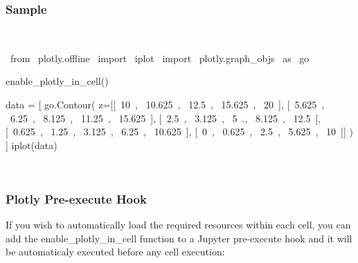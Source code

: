 \subsubsection{Sample}

\begin{paracol}{2}
\smallskip
\begin{cellExecute}[escapechar=~]
~~
\end{cellExecute}
\switchcolumn
\begin{codeCell}[escapechar=~]
~\textcolor{mtk17}{from}~ plotly.offline ~\textcolor{mtk17}{import}~ iplot
~\textcolor{mtk17}{import}~ plotly.graph_objs ~\textcolor{mtk17}{as}~ go

enable_plotly_in_cell()

data = [
    go.Contour(
        z=[[~\textcolor{mtk7}{10}~, ~\textcolor{mtk7}{10.625}~, ~\textcolor{mtk7}{12.5}~, ~\textcolor{mtk7}{15.625}~, ~\textcolor{mtk7}{20}~],
           [~\textcolor{mtk7}{5.625}~, ~\textcolor{mtk7}{6.25}~, ~\textcolor{mtk7}{8.125}~, ~\textcolor{mtk7}{11.25}~, ~\textcolor{mtk7}{15.625}~],
           [~\textcolor{mtk7}{2.5}~, ~\textcolor{mtk7}{3.125}~, ~\textcolor{mtk7}{5}~., ~\textcolor{mtk7}{8.125}~, ~\textcolor{mtk7}{12.5}~],
           [~\textcolor{mtk7}{0.625}~, ~\textcolor{mtk7}{1.25}~, ~\textcolor{mtk7}{3.125}~, ~\textcolor{mtk7}{6.25}~, ~\textcolor{mtk7}{10.625}~],
           [~\textcolor{mtk7}{0}~, ~\textcolor{mtk7}{0.625}~, ~\textcolor{mtk7}{2.5}~, ~\textcolor{mtk7}{5.625}~, ~\textcolor{mtk7}{10}~]]
    )
]
iplot(data)
\end{codeCell}
\end{paracol}

\begin{paracol}{2}
\begin{cellExecute}[escapechar=~]
~~
\end{cellExecute}
\switchcolumn
\begin{resultCell}[escapechar=~]
\end{resultCell}
\end{paracol}
\subsubsection{Plotly Pre-execute Hook}
If you wish to automatically load the required resources within each cell, you can add the enable\_plotly\_in\_cell function to a Jupyter pre-execute hook and it will be automaticaly executed before any cell execution:\\

